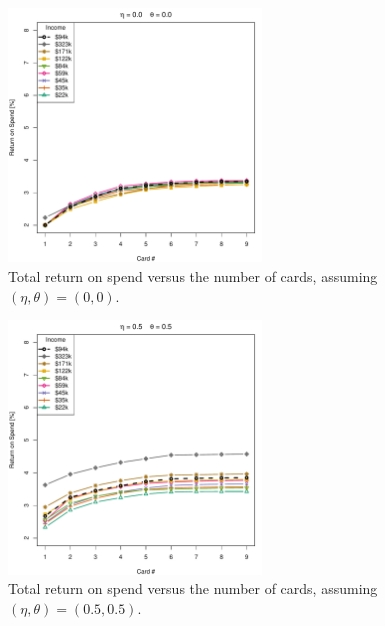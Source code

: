 \begin{figure}[tbh]
    \begin{center}
    \includegraphics[width=0.6\textwidth]{../Figures/ROSvsKvsIncome_0_0.pdf}
    \caption{Total return on spend versus the number of cards, assuming $(\eta, \theta) = (0,0)$.}
    \label{fig:ROSvsKvsIncome_0_0}
    \end{center}
\end{figure}

\begin{figure}[tbh]
    \begin{center}
    \includegraphics[width=0.6\textwidth]{../Figures/ROSvsKvsIncome_05_05.pdf}
    \caption{Total return on spend versus the number of cards, assuming $(\eta, \theta) = (0.5,0.5)$.}
    \label{fig:ROSvsKvsIncome_05_05}
    \end{center}
\end{figure}

